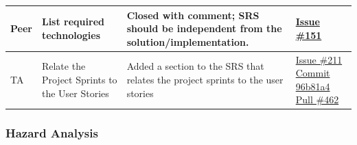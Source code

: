 \documentclass[12pt, titlepage]{article}
\begin{document}
\begin{longtable}{|p{2cm}|p{4cm}|p{5cm}|p{4cm}|}
Peer & List required technologies & Closed with comment; SRS should be independent from the solution/implementation. & \href{https://github.com/OmarHassanAdelhamid/Five-of-a-Kind-capstone-project-/issues/151}{Issue \#151} \\ \hline
TA & Relate the Project Sprints to the User Stories & Added a section to the SRS that relates the project sprints to the user stories & \href{https://github.com/OmarHassanAdelhamid/Five-of-a-Kind-capstone-project-/issues/211}{Issue \#211} \newline\href{https://github.com/OmarHassanAdelhamid/Five-of-a-Kind-capstone-project-/pull/462/changes/96b81a428fece8bdf142340ca2d9e239212c390f}{Commit 96b81a4} \newline\href{https://github.com/OmarHassanAdelhamid/Five-of-a-Kind-capstone-project-/pull/462}{Pull \#462} \\ \hline

\end{longtable}

\subsubsection{Hazard Analysis}
\end{document}
